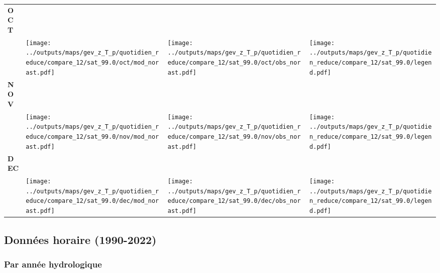 \documentclass[
  letterpaper,
  DIV=11,
  numbers=noendperiod]{scrartcl}
\begin{document}
\begin{longtable*}{m{2.0cm}m{7.9cm}m{7.9cm}m{1cm}}
\centering \textbf{OCT} \\[0.2em] \begin{tabular}{r@{\hspace{0.2em}}l}\end{tabular} & \centering \texttt{[image: ../outputs/maps/gev\_z\_T\_p/quotidien\_reduce/compare\_12/sat\_99.0/oct/mod\_norast.pdf]} & \centering \texttt{[image: ../outputs/maps/gev\_z\_T\_p/quotidien\_reduce/compare\_12/sat\_99.0/oct/obs\_norast.pdf]} & \centering \texttt{[image: ../outputs/maps/gev\_z\_T\_p/quotidien\_reduce/compare\_12/sat\_99.0/legend.pdf]} \tabularnewline
\centering \textbf{NOV} \\[0.2em] \begin{tabular}{r@{\hspace{0.2em}}l}\end{tabular} & \centering \texttt{[image: ../outputs/maps/gev\_z\_T\_p/quotidien\_reduce/compare\_12/sat\_99.0/nov/mod\_norast.pdf]} & \centering \texttt{[image: ../outputs/maps/gev\_z\_T\_p/quotidien\_reduce/compare\_12/sat\_99.0/nov/obs\_norast.pdf]} & \centering \texttt{[image: ../outputs/maps/gev\_z\_T\_p/quotidien\_reduce/compare\_12/sat\_99.0/legend.pdf]} \tabularnewline
\centering \textbf{DEC} \\[0.2em] \begin{tabular}{r@{\hspace{0.2em}}l}\end{tabular} & \centering \texttt{[image: ../outputs/maps/gev\_z\_T\_p/quotidien\_reduce/compare\_12/sat\_99.0/dec/mod\_norast.pdf]} & \centering \texttt{[image: ../outputs/maps/gev\_z\_T\_p/quotidien\_reduce/compare\_12/sat\_99.0/dec/obs\_norast.pdf]} & \centering \texttt{[image: ../outputs/maps/gev\_z\_T\_p/quotidien\_reduce/compare\_12/sat\_99.0/legend.pdf]} \tabularnewline
\end{longtable*}

\subsection{Données horaire
(1990-2022)}\label{donnuxe9es-horaire-1990-2022}

\subsubsection{Par année
hydrologique}\label{par-annuxe9e-hydrologique-4}
\end{document}

